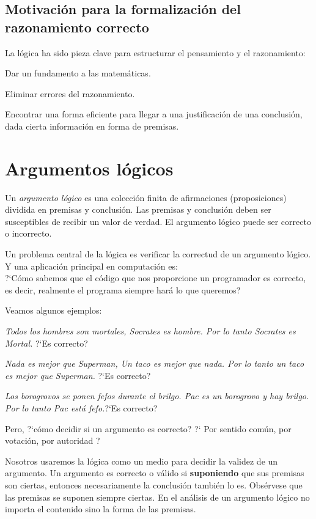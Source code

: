 \documentclass[11pt,letterpaper]{article}
\begin{document}
\subsection{Motivación para la formalización del razonamiento correcto}
\noindent La l\'ogica ha sido pieza clave para estructurar el pensamiento y el 
razonamiento:
\bi
\item Dar un fundamento a las matemáticas.
\item Eliminar errores del razonamiento.
\item Encontrar una forma eficiente para llegar a una justificación de una 
conclusión, dada cierta información en forma de premisas.
\ei

\section{Argumentos lógicos}
Un \emph{argumento lógico} es una colección finita de afirmaciones 
(proposiciones) dividida en premisas y conclusión. Las premisas y conclusión 
deben ser susceptibles de recibir un valor de verdad. El argumento lógico 
puede ser correcto o incorrecto.

Un problema central de la l\'ogica es verificar la correctud de un argumento 
lógico.
Y una aplicación principal en computación es: \\
?`Cómo sabemos que el código que nos proporcione un programador es correcto, 
es decir, realmente el programa siempre hará lo que queremos?

Veamos algunos ejemplos:
\bi
 \item \emph{Todos los hombres son mortales, Socrates es
  hombre. Por lo tanto Socrates es Mortal.} ?`Es correcto?
 \item \emph{Nada es mejor que Superman, Un taco es mejor que nada. Por lo 
  tanto un taco es mejor que Superman.} ?`Es correcto?
 \item \emph{Los borogrovos se ponen fefos durante el brilgo. Pac es un 
  borogrovo y hay brilgo. Por lo tanto Pac está fefo.}?`Es correcto?
\ei      

Pero, ?`cómo decidir si un argumento es correcto? 
?` Por sentido común, por votación, por autoridad ? 

Nosotros usaremos la l\'ogica como un medio para decidir la validez de un
argumento.
Un argumento es correcto o válido si {\bf suponiendo} que sus premisas son 
ciertas, entonces necesariamente la conclusión también lo es.   
Obsérvese que las premisas se suponen siempre ciertas. En el análisis de un   
argumento lógico no importa el contenido sino la forma de las premisas.
\end{document}
